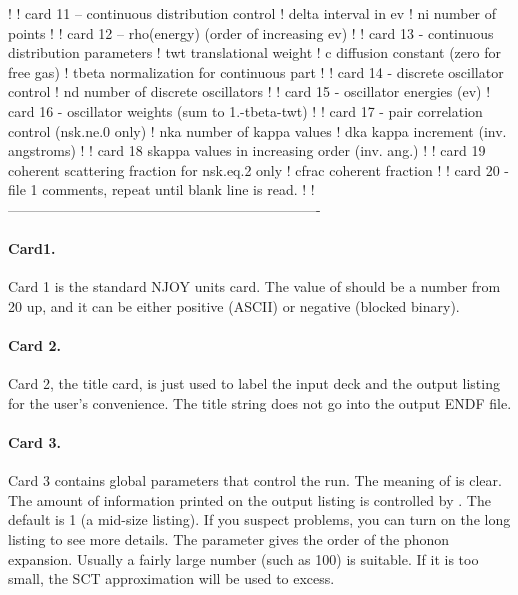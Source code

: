 \begin{ccode}
   !
   !    card 11 -- continuous distribution control
   !       delta    interval in ev
   !       ni       number of points
   !
   !    card 12 -- rho(energy) (order of increasing ev)
   !
   !    card 13 - continuous distribution parameters
   !       twt       translational weight
   !       c         diffusion constant (zero for free gas)
   !       tbeta     normalization for continuous part
   !
   !    card 14 - discrete oscillator control
   !       nd     number of discrete oscillators
   !
   !    card 15 - oscillator energies (ev)
   !    card 16 - oscillator weights (sum to 1.-tbeta-twt)
   !
   !    card 17 - pair correlation control (nsk.ne.0 only)
   !       nka     number of kappa values
   !       dka     kappa increment (inv. angstroms)
   !
   !    card 18  skappa values in increasing order (inv. ang.)
   !
   !    card 19  coherent scattering fraction for nsk.eq.2 only
   !       cfrac   coherent fraction
   !
   ! card 20 - file 1 comments, repeat until blank line is read.
   !
   !-------------------------------------------------------------------

\end{ccode}
\normalsize

\paragraph{Card1.}
Card 1 is the standard NJOY units card.  The value of  should
be a number from 20 up, and it can be either positive (ASCII) or negative
(blocked binary).

\paragraph{Card 2.}
Card 2, the title card, is just used to label the input deck and the output
listing for the user's convenience.  The title string does not go into
the output ENDF file.

\paragraph{Card 3.}
Card 3 contains global parameters that control the run.  The meaning
of  is clear. The amount of information printed on the
output listing is controlled by .  The default is 1
(a mid-size listing).  If you suspect problems, you can turn on the
long listing to see more details.  The parameter  gives
the order of the phonon expansion.  Usually a fairly large number
(such as 100) is suitable.  If it is too small, the SCT approximation
will be used to excess.

